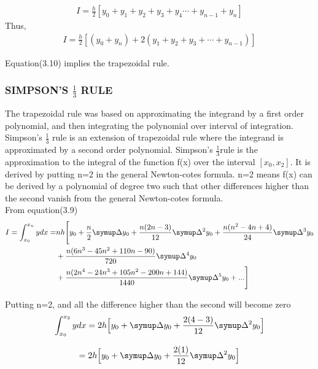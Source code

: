 \documentclass[a4paper,12pt]{report}
\numberwithin{equation}{section}
\begin{document}
\begin{align*}
I=\frac{h}{2}[y_0+y_1+y_2+y_3+y_4\cdots+y_{n-1}+y_n]
\end{align*}
Thus,
\begin{align}
I=\frac{h}{2}[(y_0+y_n)+2(y_1+y_2+y_3+\cdots+y_{n-1})]
\end{align}

Equation(3.10) implies the trapezoidal rule.  



\subsubsection{SIMPSON'S $\frac{1}{3}$ RULE}
The trapezoidal rule was based on approximating the integrand by a first order polynomial, and then integrating the polynomial over interval of integration. Simpson's $\frac{1}{3}$ rule is an extension of trapezoidal rule where the integrand is approximated by a second order polynomial. Simpson's $\frac{1}{3}$rule is the approximation to the integral of the function f(x) over the interval $[x_0,x_2]$. It is derived by putting n=2 in the general Newton-cotes formula. n=2 means f(x) can be derived by a polynomial of degree two such that other differences higher than the second vanish from the general Newton-cotes formula.\\
  From equation(3.9)
\begin{equation*}
\begin{split}
I=\int_{x_0}^{x_n}ydx=&nh\Bigg[y_0+\frac{n}{2}\symup\Delta{y_0}+\frac{n(2n-3)}{12}\symup\Delta^2y_0+\frac{n(n^2-4n+4)}{24}\symup\Delta^3y_0\\ 
&+\frac{n(6n^3-45n^2+110n-90)}{720}\symup\Delta^4y_0\\
&+\frac{n(2n^4-24n^3+105n^2-200n+144)}{1440}\symup\Delta^5y_0+...\Bigg]
\end{split}
\end{equation*}

Putting n=2, and all the difference higher than the second will become zero\\

\begin{equation*}
\int_{x_0}^{x_2}ydx=2h\Big[y_0+\symup\Delta{y_0}+\frac{2(4-3)}{12}\symup\Delta^2{y_0}\Big]
\end{equation*}

\begin{equation*}
=2h\Big[y_0+\symup\Delta{y_0}+\frac{2(1)}{12}\symup\Delta^2{y_0}\Big]
\end{equation*}
\end{document}
